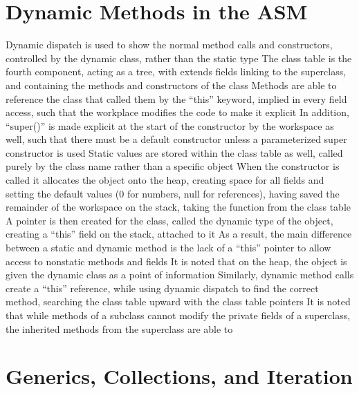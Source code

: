 \documentclass[11 pt, twoside]{article}
\newenvironment{outline*}
{
	\begin{outline}[enumerate]
	}
	{\end{outline}
}
\begin{document}
\section{Dynamic Methods in the ASM}
\begin{outline*}
\1 Dynamic dispatch is used to show the normal method calls and constructors, controlled by the dynamic class, rather than the static type
	\2 The class table is the fourth component, acting as a tree, with extends fields linking to the superclass, and containing the methods and constructors of the class
		\3 Methods are able to reference the class that called them by the ``this'' keyword, implied in every field access, such that the workplace modifies the code to make it explicit
		\3 In addition, ``super()'' is made explicit at the start of the constructor by the workspace as well, such that there must be a default constructor unless a parameterized super constructor is used
		\3 Static values are stored within the class table as well, called purely by the class name rather than a specific object
	\2 When the constructor is called it allocates the object onto the heap, creating space for all fields and setting the default values (0 for numbers, null for references), having saved the remainder of the workspace on the stack, taking the function from the class table
		\3 A pointer is then created for the class, called the dynamic type of the object, creating a ``this'' field on the stack, attached to it
			\4 As a result, the main difference between a static and dynamic method is the lack of a ``this'' pointer to allow access to nonstatic methods and fields
		\3 It is noted that on the heap, the object is given the dynamic class as a point of information
	\2 Similarly, dynamic method calls create a ``this'' reference, while using dynamic dispatch to find the correct method, searching the class table upward with the class table pointers
\1 It is noted that while methods of a subclass cannot modify the private fields of a superclass, the inherited methods from the superclass are able to
\end{outline*}
\section{Generics, Collections, and Iteration}
\begin{outline*}

\end{outline*}
\end{document}

